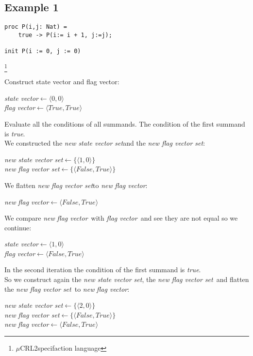 \documentclass[a4paper,10pt]{article}
\newcommand{\mcrl}{$\mu$CRL2}
\newcommand{\ti}{\textit}
\newcommand{\sv}{\textit{state vector}}
\newcommand{\fv}{\textit{flag vector}}
\newcommand{\svs}{\textit{new state vector set}}
\newcommand{\fvs}{\textit{new flag vector set}}
\newcommand{\la}{$\leftarrow$}
\begin{document}
\subsection{Example 1}
\begin{verbatim}
proc P(i,j: Nat) =
	true -> P(i:= i + 1, j:=j);

init P(i := 0, j := 0)
\end{verbatim} \footnote{\mcrl specifaction language}

Construct state vector and flag vector: 
\begin{center}\begin{minipage}{250pt}
\sv \la  $\langle 0 , 0 \rangle$\\
\fv \la  $\langle True , True \rangle$\\
\end{minipage}\end{center}

Evaluate all the conditions of all summands.
The condition of the first summand is \ti{true}.\\

We constructed the \svs and the \fvs :
\begin{center}\begin{minipage}{250pt}
\svs \la  $\lbrace \langle 1 , 0 \rangle \rbrace $\\
\fvs \la  $\lbrace \langle False , True \rangle \rbrace $\\
\end{minipage}\end{center}

We flatten \fvs to \ti{new} \fv : 
\begin{center}\begin{minipage}{250pt}
\ti{new} \fv \la $\langle False , True \rangle $
\end{minipage}\end{center}

We compare \ti{new} \fv\ with \fv\ and see they are not equal so we continue:
\begin{center}\begin{minipage}{250pt}
\sv \la $\langle 1 , 0 \rangle $\\
\fv \la $\langle False , True \rangle $\\
\end{minipage}\end{center}

In the second iteration the condition of the first summand is \ti{true}.\\
So we construct again the \svs, the \fvs\ and flatten the \fvs\ to \ti{new} \fv: 
\begin{center}\begin{minipage}{250pt}
\svs \la  $\lbrace \langle 2 , 0 \rangle \rbrace $\\
\fvs \la  $\lbrace \langle False , True \rangle \rbrace $\\
\ti{new} \fv \la  $\langle False , True \rangle $ \\
\end{minipage}\end{center}
\end{document}
